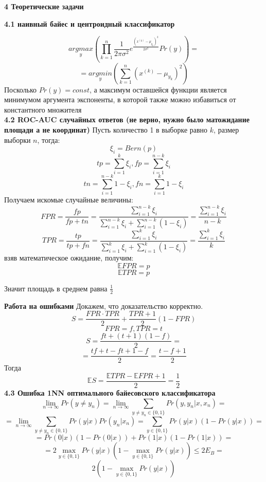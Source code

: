 \documentclass[11pt,a4paper]{article}
\begin{document}
\begin{center}
\Huge {
\noindent
\textbf{4 Теоретические задачи}
}
\end{center}
\Large {
\textbf {4.1 наивный байес и центроидный классификатор}
}

$$ \underset{y}{argmax} (\prod_{k=1}^{n} \frac{1}{2\pi \sigma^2}e^{\frac{(x^{(k)} - \mu_{y_k})^2}{2 \sigma^2}}  Pr(y)) = $$
$$=\underset{y}{argmin} (\sum_{k=1}^{n} (x^{(k)} - \mu_{y_k})^2) $$
Посколько $Pr(y) = const$,
а максимум оставшейся функции является минимумом аргумента экспоненты, в которой также можно избавиться от константного множителя
\\
\Large{
\textbf {4.2 ROC-AUC случайных ответов (не верно, нужно было матожидание площади а не координат)}
}
Пусть количество 1 в выборке равно $k$, размер выборки $n$, тогда:
\\
$$ \xi_i = Bern(p) $$
$$ tp = \sum_{i=1}^{k} \xi_i,  fp = \sum_{i=1}^{n - k} \xi_i$$
$$ tn = \sum_{i=1}^{n - k} 1- \xi_i,  fn = \sum_{i=1}^{k} 1 - \xi_i$$
Получаем искомые случайные величины:
$$ FPR = \frac{fp}{fp + tn} = \frac{\sum_{i=1}^{n-k} \xi_i}{\sum_{i=1}^{n-k} \xi_i + \sum_{i=1}^{n-k} (1 - \xi_i)} = \frac{\sum_{i=1}^{n-k} \xi_i}{n-k}$$
$$ TPR = \frac{tp}{tp + fn} = \frac{\sum_{i=1}^{k} \xi_i}{\sum_{i=1}^k \xi_i + \sum_{i=1}^{k} (1 - \xi_i)} = \frac{\sum_{i=1}^{k}  \xi_i}{k}$$
взяв математическое ожидание, получим:
$$ \mathbb{E} FPR = p$$
$$ \mathbb{E} TPR = p$$

Значит площадь в среднем равна $\frac{1}{2}$

\textbf{Работа на ошибками}
Докажем, что доказательство корректно.
$$ S = \frac{FPR \cdot TPR}{2} + \frac{TPR + 1}{2} (1 - FPR) $$
$$ FPR = f, TPR = t $$
$$ S = \frac{ft + (t + 1)(1 - f)}{2} = $$
$$ = \frac{tf + t - ft + 1 - f}{2} = \frac{t - f + 1}{2}$$
Тогда $$ \mathbb{E} S = \frac{\mathbb{E}TPR - \mathbb{E}FPR + 1}{2} = \frac{1}{2}$$
\Large{
\textbf {4.3 Ошибка 1NN оптимального байесовского классификатора}
}
$$ \lim_{n \to \infty} Pr(y \ne y_n) = \lim_{n \to \infty} \sum_{y \ne y_n \in \{0, 1\}} Pr(y, y_n | x, x_n) =$$
$$= \lim_{n \to \infty} \sum_{y \ne y_n \in \{0, 1\}} Pr(y|x) Pr(y_n|x_n) = \sum_{y \in \{0, 1\}} Pr(y|x) (1 - Pr(y|x)) = $$
$$= Pr(0|x)(1 - Pr(0|x)) + Pr(1 | x) (1 - Pr(1 | x)) = $$
$$= 2 \max_{y \in \{0, 1\}} Pr(y|x) (1 - \max_{y \in \{0, 1\}} Pr(y|x)) \le 2E_B = $$
$$ 2 (1 - \max_{y \in \{0, 1\}} Pr(y|x))$$
\end{document}

